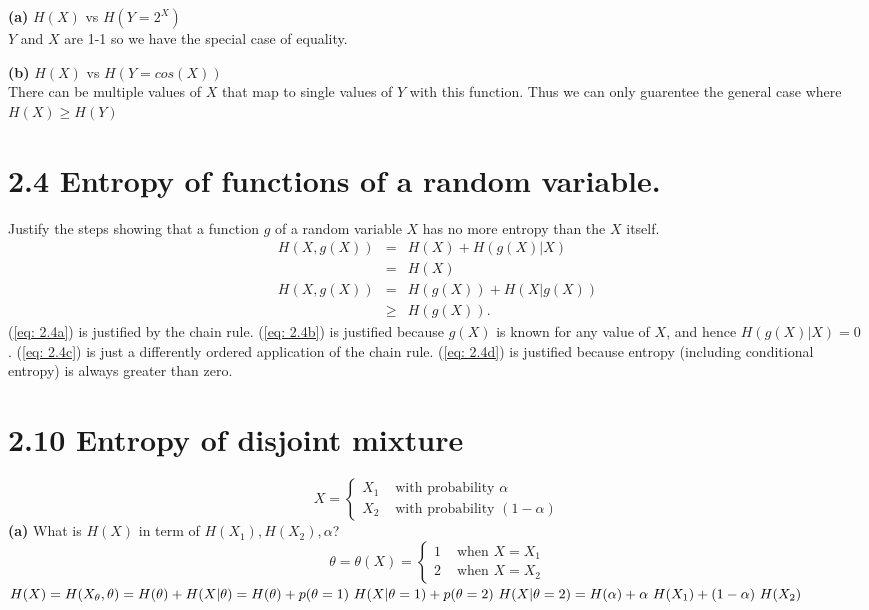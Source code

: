 \documentclass[10pt]{article}
\newcommand{\pref}[1]{{(\ref{#1})}}
\begin{document}
\begin{tiny}
\begin{multicols}{3}
\textbf{(a)} $H(X)$ vs $H(Y=2^{X})$\\
$Y$ and $X$ are 1-1 so we have the special case of equality.

\textbf{(b)} $H(X)$ vs $H(Y=cos(X))$ \\
There can be multiple values of $X$ that map to single values of $Y$ with this function. Thus we can only guarentee the general case where $H(X) \geq H(Y)$

\section*{2.4 Entropy of functions of a random variable.}
Justify the steps showing that a function $g$ of a random variable $X$ has no
more entropy than the $X$ itself.
\begin{eqnarray}
H(X,g(X))  &=& H(X) + H(g(X) | X) \label{eq: 2.4a} \\
    &=& H(X) \label{eq: 2.4b} \\
    H(X,g(X)) &=& H(g(X))+H(X|g(X)) \label{eq: 2.4c} \\
    &\geq& H(g(X)) \label{eq: 2.4d}.
\end{eqnarray}
\pref{eq: 2.4a} is justified by the chain rule.
\pref{eq: 2.4b} is justified because $g(X)$ is known for any value of $X$,
and hence $H(g(X)|X)=0$ . 
\pref{eq: 2.4c} is just a differently ordered application of the chain rule.
\pref{eq: 2.4d} is justified because entropy (including conditional entropy) is always greater
than zero.

\section*{2.10 Entropy of disjoint mixture}
\begin{equation*}
X=\begin{cases} 
    X_1 & \text{ with probability } \alpha \\
    X_2 & \text{ with probability } (1-\alpha) 
\end{cases} 
\end{equation*}
\textbf{(a)} What is $H(X)$ in term of $H(X_1), H(X_2), \alpha$? 
\begin{equation}
    \theta = \theta(X) = 
        \begin{cases}
            1 & \text{ when } X=X_{1}\\ 
            2 & \text{ when }  X = X_{2} \end{cases}
    \label{eq: theta of X}
\end{equation}
\(
	H(X) = H(X_\theta,\theta) = H(\theta) + H(X|\theta) \\
	= H(\theta)+p(\theta = 1)\ H(X|\theta=1)+p(\theta=2)\ H(X|\theta=2) \\
	= H(\alpha) + \alpha\ H(X_{1}) + (1-\alpha)\ H(X_{2}) \)


\end{multicols}
\end{tiny}
\end{document}
